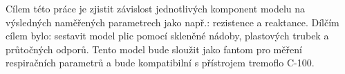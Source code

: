 Cílem této práce je zjistit závislost jednotlivých komponent modelu na výsledných naměřených parametrech jako např.: rezistence a reaktance. Dílčím cílem bylo: sestavit model plic pomocí skleněné nádoby, plastových trubek a průtočných odporů. Tento model bude sloužit jako fantom pro měření respiračních parametrů a bude kompatibilní s přístrojem tremoflo C-100.
